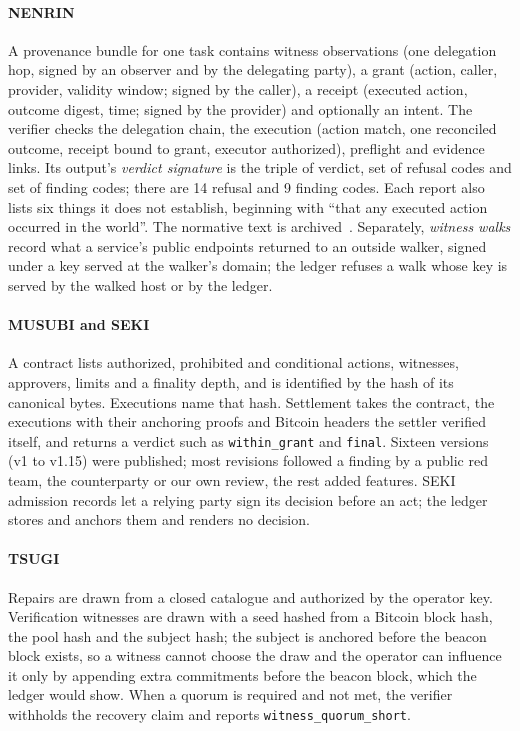 \documentclass[preprint,12pt,authoryear]{elsarticle}
\newcommand{\code}[1]{\texttt{#1}}
\begin{document}
\paragraph{NENRIN} A provenance bundle for one task contains witness observations (one delegation hop, signed by an observer and by the delegating party), a grant (action, caller, provider, validity window; signed by the caller), a receipt (executed action, outcome digest, time; signed by the provider) and optionally an intent. The verifier checks the delegation chain, the execution (action match, one reconciled outcome, receipt bound to grant, executor authorized), preflight and evidence links. Its output's \emph{verdict signature} is the triple of verdict, set of refusal codes and set of finding codes; there are 14 refusal and 9 finding codes. Each report also lists six things it does not establish, beginning with ``that any executed action occurred in the world''. The normative text is archived~\citep{zenodoverifier}. Separately, \emph{witness walks} record what a service's public endpoints returned to an outside walker, signed under a key served at the walker's domain; the ledger refuses a walk whose key is served by the walked host or by the ledger.

\paragraph{MUSUBI and SEKI} A contract lists authorized, prohibited and conditional actions, witnesses, approvers, limits and a finality depth, and is identified by the hash of its canonical bytes. Executions name that hash. Settlement takes the contract, the executions with their anchoring proofs and Bitcoin headers the settler verified itself, and returns a verdict such as \code{within\_grant} and \code{final}. Sixteen versions (v1 to v1.15) were published; most revisions followed a finding by a public red team, the counterparty or our own review, the rest added features. SEKI admission records let a relying party sign its decision before an act; the ledger stores and anchors them and renders no decision.

\paragraph{TSUGI} Repairs are drawn from a closed catalogue and authorized by the operator key. Verification witnesses are drawn with a seed hashed from a Bitcoin block hash, the pool hash and the subject hash; the subject is anchored before the beacon block exists, so a witness cannot choose the draw and the operator can influence it only by appending extra commitments before the beacon block, which the ledger would show. When a quorum is required and not met, the verifier withholds the recovery claim and reports \code{witness\_quorum\_short}.
\end{document}
